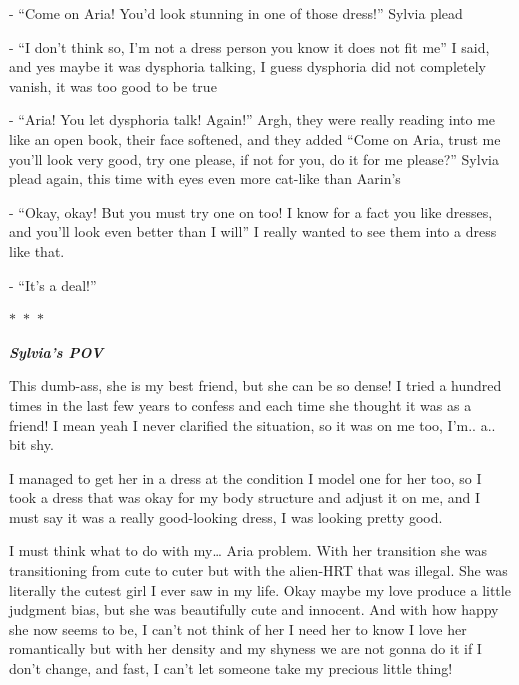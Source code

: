 \documentclass[colorlinks,12pt,a4paper]{book}
\newcommand\sep{\begin{center}
  \boldmath $\ast$~$\ast$~$\ast$
\end{center}}
\begin{document}
 - “Come on Aria! You'd look stunning in one of those dress!” Sylvia plead\par
 \bigskip
 - “I don't think so, I'm not a dress person you know it does not fit me” I said, and yes maybe it was dysphoria talking, 
 I guess dysphoria did not completely vanish, it was too good to be true\par
 \bigskip
 
 - “Aria! You let dysphoria talk! Again!” Argh, they were really reading into me like an open book, their face softened, and 
 they added “Come on Aria, trust me you'll look very good, try one please, if not for you, do it for me please?” Sylvia 
 plead again, this time with eyes even more cat-like than Aarin's\par
 \bigskip
 
 - “Okay, okay! But you must try one on too! I know for a fact you like dresses, and you'll look even better than I will” 
 I really wanted to see them into a dress like that.\par
 \bigskip
 
 - “It's a deal!”
 
 \sep 
 
 \textit{\textbf{Sylvia's POV}}\par
 \bigskip
 
 This dumb-ass, she is my best friend, but she can be so dense! I tried a hundred times in the last few years to confess and 
 each time she thought it was as a friend! I mean yeah I never clarified the situation, so it was on me too, 
 I'm.. a.. bit shy.\par
 \bigskip
 
 I managed to get her in a dress at the condition I model one for her too, so I took a dress that was okay for my body 
 structure and adjust it on me, and I must say it was a really good-looking dress, I was looking pretty good.\par
 \bigskip
 
 I must think what to do with my… Aria problem. With her transition she was transitioning from cute to cuter but with the 
 alien-HRT that was illegal. She was literally the cutest girl I ever saw in my life. Okay maybe my love produce a 
 little judgment bias, but she was beautifully cute and innocent. And with how happy she now seems to be, I can't not think of her 
 I need her to know I love her romantically but with her density and my shyness we are not gonna do it if I don't change, 
 and fast, I can't let someone take my precious little thing! \par
 \bigskip
 
\end{document}
